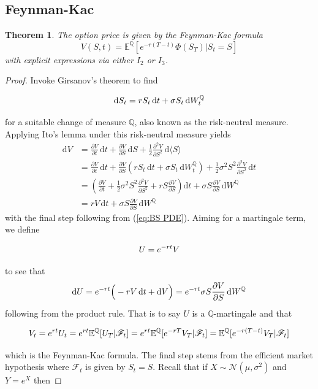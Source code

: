 \documentclass[12pt]{article}
\newtheorem{theorem}{Theorem}
\theoremstyle{definition}
\theoremstyle{remark}
\begin{document}
\subsection{Feynman-Kac}
\begin{theorem}
\label{thm: fk formula and solutions}
	The option price is given by the Feynman-Kac formula
	$$
	V(S,t) = \mathbb{E}^\mathbb{Q} [e^{-r(T-t)}\Phi(S_T)|S_t = S]
	$$
	with explicit expressions via either $I_2$ or $I_3$.
\end{theorem}
\begin{proof}
	Invoke Girsanov's theorem to find
	$$
	\vphantom{\int} \mathrm{d}S_t = r S_t \,\mathrm{d}t + \sigma S_t \,\mathrm{d}W_t^\mathbb{Q}
	$$
	for a suitable change of measure $\mathbb{Q}$, also known as the risk-neutral measure. Applying Ito's lemma under this risk-neutral measure yields
	\begin{align*}
		\mathrm{d}V
		&= \frac{\partial V}{\partial t} \, \mathrm{d}t + \frac{\partial V}{\partial S} \, \mathrm{d}S + \frac{1}{2} \frac{\partial^{2}V}{\partial S^{2}} \, \mathrm{d} \langle S \rangle \\
		&= \frac{\partial V}{\partial t} \, \mathrm{d}t + \frac{\partial V}{\partial S} \left( r S_t \,\mathrm{d}t + \sigma S_t\, \mathrm{d}W_t^\mathbb{Q} \right) + \frac{1}{2} \sigma^2 S^2 \frac{\partial^{2}V}{\partial S^{2}} \, \mathrm{d}t \\
		&= \left( \frac{\partial V}{\partial t} + \frac{1}{2} \sigma^{2} S^{2} \frac{\partial^2 V}{\partial S^2} + rS \frac{\partial V}{\partial S} \right) \mathrm{d}t + \sigma S \frac{\partial V}{\partial S} \, \mathrm{d}W^\mathbb{Q} \\
		&= rV\,\mathrm{d}t + \sigma S \frac{\partial V}{\partial S} \, \mathrm{d}W^\mathbb{Q}
	\end{align*}
	with the final step following from (\ref{eq:BS PDE}). Aiming for a martingale term, we define
	$$
	\vphantom{\int} U = e^{-rt}V
	$$
	to see that
	$$
	\vphantom{\int} \mathrm{d}U = e^{-rt} \Big( -rV\,\mathrm{d}t + \mathrm{d}V \Big) = e^{-rt} \sigma S \frac{\partial V}{\partial S} \, \mathrm{d}W^\mathbb{Q}
	$$
	following from the product rule. That is to say $U$ is a $\mathbb{Q}$-martingale and that
	$$
	\vphantom{\int} V_t = e^{rt}U_t = e^{rt} \mathbb{E}^\mathbb{Q} [U_T|\mathscr{F}_t] = e^{rt} \mathbb{E}^\mathbb{Q} [e^{-rT}V_T|\mathscr{F}_t] = \mathbb{E}^\mathbb{Q} [e^{-r(T-t)}V_T|\mathscr{F}_t]
	$$
	which is the Feynman-Kac formula. The final step stems from the efficient market hypothesis where $\mathscr{F}_t$ is given by $S_t = S$. Recall that if $X\sim\mathcal{N}(\mu, \sigma^2)$ and $Y=e^X$ then

\end{proof}
\end{document}

